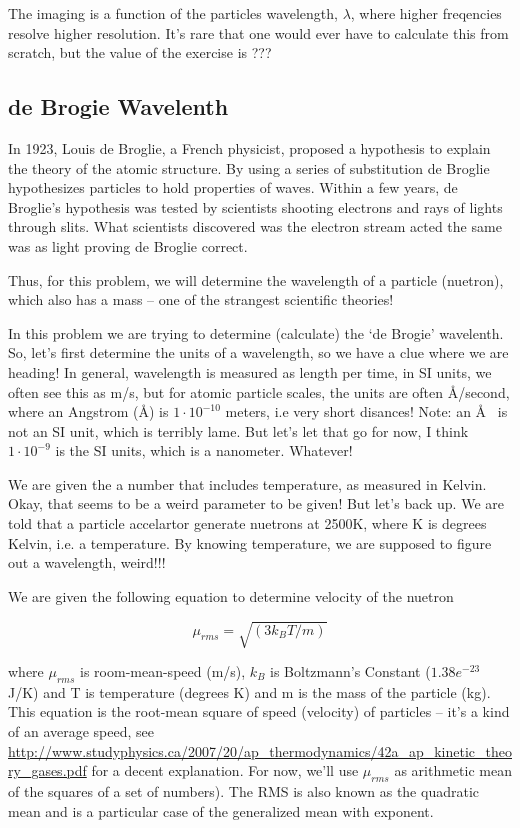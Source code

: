 \documentclass{article}
\newcommand{\angstrom}{\textup{\AA}}
\begin{document}
The imaging is a function of the particles wavelength, $\lambda$, where higher freqencies resolve higher resolution. It's rare that one would ever have to calculate this from scratch, but the value of the exercise is ??? 

\subsection{de Brogie Wavelenth}

In 1923, Louis de Broglie, a French physicist, proposed a hypothesis to explain the theory of the atomic structure. By using a series of substitution de Broglie hypothesizes particles to hold properties of waves. Within a few years, de Broglie's hypothesis was tested by scientists shooting electrons and rays of lights through slits. What scientists discovered was the electron stream acted the same was as light proving de Broglie correct.

Thus, for this problem, we will determine the wavelength of a particle (nuetron), which also has a mass -- one of the strangest scientific theories!

In this problem we are trying to determine (calculate) the `de Brogie' wavelenth. So, let's first determine the units of a wavelength, so we have a clue where we are heading!  In general, wavelength is measured as length per time, in SI units, we often see this as m/s, but for atomic particle scales, the units are often \angstrom/second, where an Angstrom (\angstrom) is $1 \cdot  10^{-10}$ meters, i.e very short disances! Note: an \angstrom~ is not an SI unit, which is terribly lame. But let's let that go for now, I think $1\cdot 10^{-9}$ is the SI units, which is a nanometer.  Whatever!

We are given the a number that includes temperature, as measured in Kelvin. Okay, that seems to be a weird parameter to be given! But let's back up. We are told that a particle accelartor generate nuetrons at 2500K, where K is degrees Kelvin, i.e. a temperature. By knowing temperature, we are supposed to figure out a wavelength, weird!!!

We are given the following equation to determine velocity of the nuetron

\begin{equation}
\mu_{rms} = \sqrt{(3k_BT/m)}
\end{equation}

where $\mu_{rms}$ is room-mean-speed (m/s), $k_B$ is Boltzmann's Constant ($1.38e^{-23}$ J/K) and T is temperature (degrees K) and m is the mass of the particle (kg). This equation is the root-mean square of speed (velocity) of particles -- it's a kind of an average speed, see \url{http://www.studyphysics.ca/2007/20/ap_thermodynamics/42a_ap_kinetic_theory_gases.pdf} for a decent explanation. For now, we'll use $\mu_{rms}$ as arithmetic mean of the squares of a set of numbers). The RMS is also known as the quadratic mean and is a particular case of the generalized mean with exponent.
\end{document}
